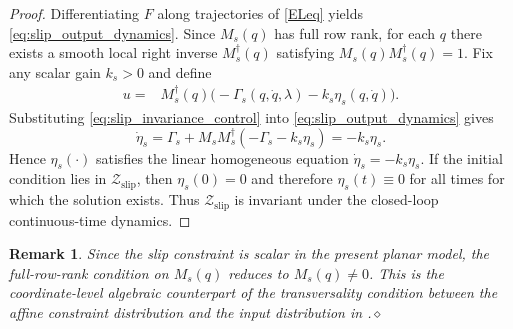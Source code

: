\documentclass[letterpaper, 10 pt, conference]{ieeeconf}
\newtheorem{remark}{Remark}
\newtheorem{proposition}{Proposition}
\begin{document}
{\begin{proof}
Differentiating $F$ along trajectories of \eqref{ELeq} yields \eqref{eq:slip_output_dynamics}. Since $M_s(q)$ has full row rank, for each $q$ there exists a smooth local right inverse $M_s^\dagger(q)$ satisfying
$M_s(q)M_s^\dagger(q)=1$. Fix any scalar gain $k_s>0$ and define
\begin{align}
u
=&
M_s^\dagger(q)\bigl(-\Gamma_s(q,\dot q,\lambda)-k_s\eta_s(q,\dot q)\bigr).
\label{eq:slip_invariance_control}
\end{align}
Substituting \eqref{eq:slip_invariance_control} into \eqref{eq:slip_output_dynamics} gives
\[
\dot\eta_s
=
\Gamma_s+M_sM_s^\dagger(-\Gamma_s-k_s\eta_s)
=
-k_s\eta_s.
\]
Hence $\eta_s(\cdot)$ satisfies the linear homogeneous equation $\dot\eta_s=-k_s\eta_s$. If the initial condition lies in $\mathcal Z_{\mathrm{slip}}$, then $\eta_s(0)=0$ and therefore $\eta_s(t)\equiv 0$ for all times for which the solution exists. Thus $\mathcal Z_{\mathrm{slip}}$ is invariant under the closed-loop continuous-time dynamics.
\end{proof}

\begin{remark}
Since the slip constraint is scalar in the present planar model, the full-row-rank condition on $M_s(q)$ reduces to $M_s(q)\neq 0$. This is the coordinate-level algebraic counterpart of the transversality condition between the affine constraint distribution and the input distribution in \cite{stratoglou2023virtual}.\hfill$\diamond$
\end{remark}



}
\end{document}
